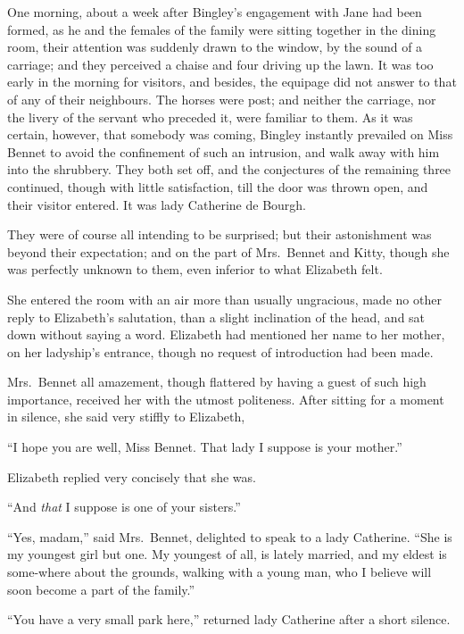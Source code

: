 
One morning, about a week after Bingley’s engagement
with Jane had been formed, as he and the females of the
family were sitting together in the dining room, their
attention was suddenly drawn to the window, by the
sound of a carriage; and they perceived a chaise and four
driving up the lawn. It was too early in the morning for
visitors, and besides, the equipage did not answer to that
of any of their neighbours. The horses were post; and
neither the carriage, nor the livery of the servant who
preceded it, were familiar to them. As it was certain,
however, that somebody was coming, Bingley instantly
prevailed on Miss Bennet to avoid the confinement of
such an intrusion, and walk away with him into the
shrubbery. They both set off, and the conjectures of the
remaining three continued, though with little satisfaction,
till the door was thrown open, and their visitor entered.
It was lady Catherine de Bourgh.

They were of course all intending to be surprised; but
their astonishment was beyond their expectation; and on
the part of Mrs.\ Bennet and Kitty, though she was perfectly
unknown to them, even inferior to what Elizabeth felt.

She entered the room with an air more than usually
ungracious, made no other reply to Elizabeth’s salutation,
than a slight inclination of the head, and sat down without
saying a word. Elizabeth had mentioned her name to
her mother, on her ladyship’s entrance, though no request
of introduction had been made.

Mrs.\ Bennet all amazement, though flattered by having
a guest of such high importance, received her with the
utmost politeness. After sitting for a moment in silence,
she said very stiffly to Elizabeth,

“I hope you are well, Miss Bennet. That lady I suppose
is your mother.”

Elizabeth replied very concisely that she was.

“And \textit{that} I suppose is one of your sisters.”

“Yes, madam,” said Mrs.\ Bennet, delighted to speak
to a lady Catherine. “She is my youngest girl but one.
My youngest of all, is lately married, and my eldest is
some-where about the grounds, walking with a young man,
who I believe will soon become a part of the family.”

“You have a very small park here,” returned lady
Catherine after a short silence.

